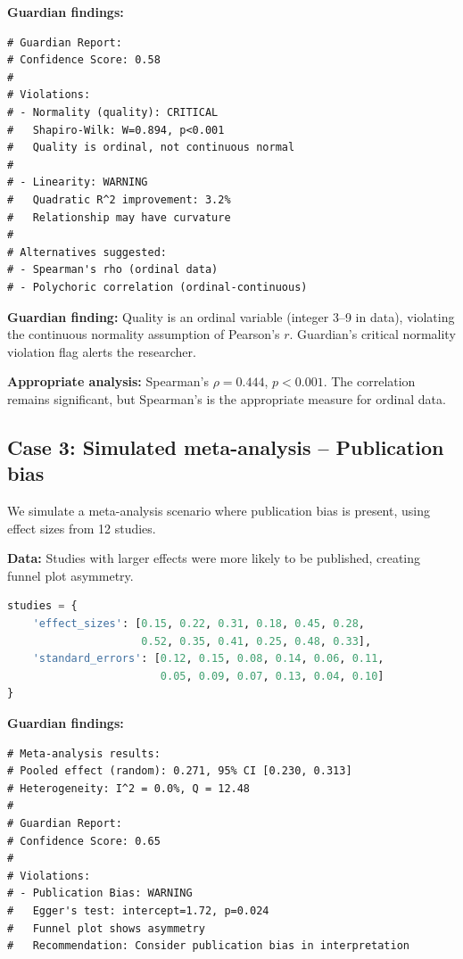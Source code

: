 \documentclass[article]{jss}
\begin{document}
\textbf{Guardian findings:}

\begin{lstlisting}
# Guardian Report:
# Confidence Score: 0.58
#
# Violations:
# - Normality (quality): CRITICAL
#   Shapiro-Wilk: W=0.894, p<0.001
#   Quality is ordinal, not continuous normal
#
# - Linearity: WARNING
#   Quadratic R^2 improvement: 3.2%
#   Relationship may have curvature
#
# Alternatives suggested:
# - Spearman's rho (ordinal data)
# - Polychoric correlation (ordinal-continuous)
\end{lstlisting}

\textbf{Guardian finding:} Quality is an ordinal variable (integer 3--9 in data), violating the continuous normality assumption of Pearson's $r$. Guardian's critical normality violation flag alerts the researcher.

\textbf{Appropriate analysis:} Spearman's $\rho = 0.444$, $p < 0.001$. The correlation remains significant, but Spearman's is the appropriate measure for ordinal data.

\subsection{Case 3: Simulated meta-analysis -- Publication bias}

We simulate a meta-analysis scenario where publication bias is present, using effect sizes from 12 studies.

\textbf{Data:} Studies with larger effects were more likely to be published, creating funnel plot asymmetry.

\begin{lstlisting}[language=Python]
studies = {
    'effect_sizes': [0.15, 0.22, 0.31, 0.18, 0.45, 0.28,
                     0.52, 0.35, 0.41, 0.25, 0.48, 0.33],
    'standard_errors': [0.12, 0.15, 0.08, 0.14, 0.06, 0.11,
                        0.05, 0.09, 0.07, 0.13, 0.04, 0.10]
}
\end{lstlisting}

\textbf{Guardian findings:}

\begin{lstlisting}
# Meta-analysis results:
# Pooled effect (random): 0.271, 95% CI [0.230, 0.313]
# Heterogeneity: I^2 = 0.0%, Q = 12.48
#
# Guardian Report:
# Confidence Score: 0.65
#
# Violations:
# - Publication Bias: WARNING
#   Egger's test: intercept=1.72, p=0.024
#   Funnel plot shows asymmetry
#   Recommendation: Consider publication bias in interpretation
\end{lstlisting}
\end{document}
